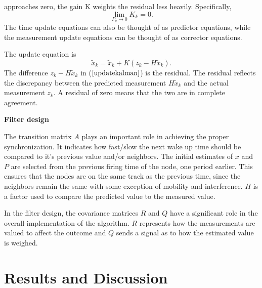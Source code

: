 \documentclass[journal]{IEEEtran}
\begin{document}
approaches zero, the gain K weights the residual less heavily.
Specifically,
\begin{equation}
\mathop {\lim }\limits_{P_k \to 0 } {K_k} = 0.
\end{equation}
The time update equations can also be thought of as predictor
equations, while the measurement update equations can be thought of
as corrector equations.
\par
The update equation is
\begin{equation}
\tilde x_k = \tilde x_k + K(z_k-H\tilde x_k).
\label{updatekalman}
\end{equation}
The difference $z_k - H\tilde x_k$ in ($\ref{updatekalman}$) is the residual. The residual reflects the discrepancy between the predicted measurement $H\tilde x_k$ and the actual measurement $z_k$. A residual of zero means that the two are in complete agreement. \par \noindent
\textbf{Filter design} \par
The transition matrix $A$ plays an important role in achieving
the proper synchronization. It indicates how fast/slow the next wake up time should be compared
to it's previous value and/or neighbors. The initial estimates of $x$ and $P$ are selected from the
previous firing time of the node, one period earlier. This ensures that the nodes are on the same track as the previous time, since the neighbors remain the same with some exception of mobility and interference. $H$ is a factor used to compare the predicted value to the measured value. \par
In the filter design, the covariance matrices $R$ and $Q$ have a significant
role in the overall implementation of the algorithm. $R$ represents how
 the measurements are valued to affect the outcome and $Q$
sends a signal as to how the estimated value is weighed.
\section{\textbf{Results and Discussion}}
\end{document}
